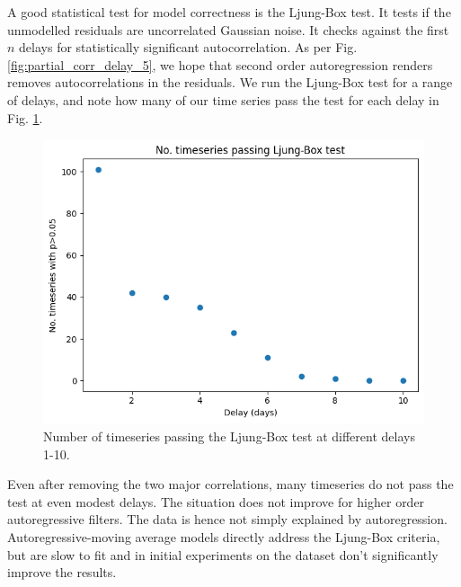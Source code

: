 \documentclass[12pt,a4paper]{article} %
\begin{document}
A good statistical test for model correctness is the Ljung-Box test. It tests if the unmodelled residuals are uncorrelated Gaussian noise. It checks against the first $n$ delays for statistically significant autocorrelation. As per Fig. \ref{fig:partial_corr_delay_5}, we hope that second order autoregression renders removes autocorrelations in the residuals. We run the Ljung-Box test for a range of delays, and note how many of our time series pass the test for each delay in Fig. \ref{fig:lb_test}.
\begin{figure}[!ht]
    \centering
    \includegraphics[width=.7\linewidth]{mean_ljung_box.png}
    \caption{Number of timeseries passing the Ljung-Box test at different delays 1-10.}
    \label{fig:lb_test}
\end{figure}
Even after removing the two major correlations, many timeseries do not pass the test at even modest delays. The situation does not improve for higher order autoregressive filters. The data is hence not simply explained by autoregression. Autoregressive-moving average models directly address the Ljung-Box criteria, but are slow to fit and in initial experiments on the dataset don't significantly improve the results.\\\\
\end{document}
